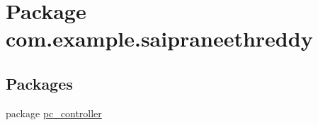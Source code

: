 \hypertarget{namespacecom_1_1example_1_1saipraneethreddy}{}\section{Package com.\+example.\+saipraneethreddy}
\label{namespacecom_1_1example_1_1saipraneethreddy}
\subsection*{Packages}
\begin{DoxyCompactItemize}
\item 
package \hyperlink{namespacecom_1_1example_1_1saipraneethreddy_1_1pc__controller}{pc\+\_\+controller}
\end{DoxyCompactItemize}
